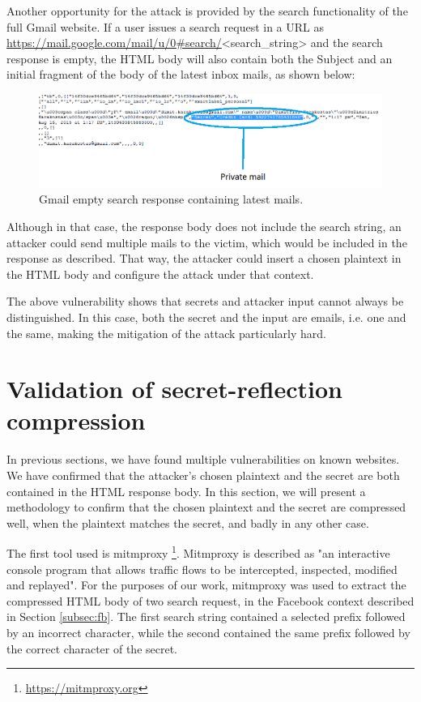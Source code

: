Another opportunity for the attack is provided by the search functionality of
the full Gmail website. If a user issues a search request in a URL as
\url{https://mail.google.com/mail/u/0#search/}<search\_string> and the search
response is empty, the HTML body will also contain both the Subject and an
initial fragment of the body of the latest inbox mails, as shown below:

\begin{figure}[H] \caption{Gmail empty search response containing latest mails.}
\centering
\includegraphics[width=1.1\textwidth]{diagrams/gmail_plain_response.png}\end{figure}

Although in that case, the response body does not include the search string, an
attacker could send multiple mails to the victim, which would be included in the
response as described. That way, the attacker could insert a chosen plaintext in
the HTML body and configure the attack under that context.

The above vulnerability shows that secrets and attacker input cannot always be
distinguished. In this case, both the secret and the input are emails, i.e. one
and the same, making the mitigation of the attack particularly hard.

\section{Validation of secret-reflection compression}\label{sec:mitmproxy}

In previous sections, we have found multiple vulnerabilities on known websites.
We have confirmed that the attacker's chosen plaintext and the secret are both
contained in the HTML response body. In this section, we will present a
methodology to confirm that the chosen plaintext and the secret are compressed
well, when the plaintext matches the secret, and badly in any other case.

The first tool used is mitmproxy \footnote{\url{https://mitmproxy.org}}.
Mitmproxy is described as "an interactive console program that allows traffic
flows to be intercepted, inspected, modified and replayed". For the purposes of
our work, mitmproxy was used to extract the compressed HTML body of two search
request, in the Facebook context described in Section \ref{subsec:fb}. The first
search string contained a selected prefix followed by an incorrect character,
while the second contained the same prefix followed by the correct character of
the secret.

